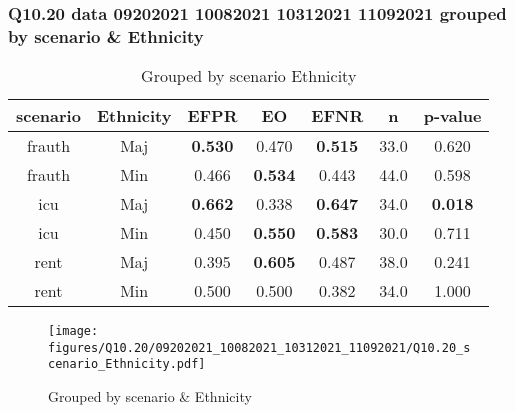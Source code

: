 \subsubsection{Q10.20 data 09202021 10082021 10312021 11092021 grouped by scenario \& Ethnicity}

\begin{comment}
                   EFPR        EO      EFNR     n    pvalue
(frauth, Maj)  0.530303  0.469697  0.515152  33.0  0.620400
(frauth, Min)  0.465909  0.534091  0.443182  44.0  0.597671
(icu, Maj)     0.661765  0.338235  0.647059  34.0  0.018443
(icu, Min)     0.450000  0.550000  0.583333  30.0  0.711365
(rent, Maj)    0.394737  0.605263  0.486842  38.0  0.241129
(rent, Min)    0.500000  0.500000  0.382353  34.0  1.000000
\end{comment}

\begin{table}[h]
    \centering
    \begin{tabular}{|c|c|c|c|c|c|c|}
        \hline
        scenario & Ethnicity & EFPR & EO & EFNR & n & p-value\\
        \hline
        frauth & Maj & \textbf{0.530} & 0.470 & \textbf{0.515} & 33.0 & 0.620\\
		frauth & Min & 0.466 & \textbf{0.534} & 0.443 & 44.0 & 0.598\\
		icu & Maj & \textbf{0.662} & 0.338 & \textbf{0.647} & 34.0 & \textbf{0.018}\\
		icu & Min & 0.450 & \textbf{0.550} & \textbf{0.583} & 30.0 & 0.711\\
		rent & Maj & 0.395 & \textbf{0.605} & 0.487 & 38.0 & 0.241\\
		rent & Min & 0.500 & 0.500 & 0.382 & 34.0 & 1.000\\
		
        \hline
    \end{tabular}
    \caption{Grouped by scenario Ethnicity}
    \label{tab:my_label}
\end{table}
\begin{figure}[h]
    \centering
    \texttt{[image: figures/Q10.20/09202021\_10082021\_10312021\_11092021/Q10.20\_scenario\_Ethnicity.pdf]}
    \caption{Grouped by scenario \& Ethnicity}
    \label{fig:my_label}
\end{figure}
